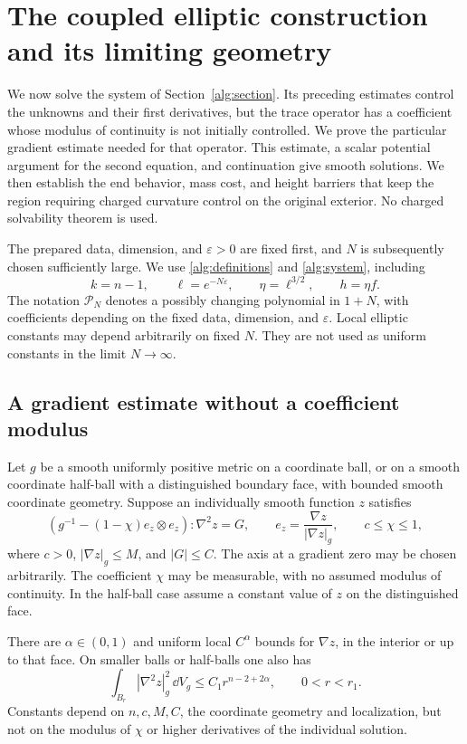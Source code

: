 \section{The coupled elliptic construction and its limiting geometry}
\label{pde:section}

We now solve the system of Section~\ref{alg:section}.  Its preceding
estimates control the unknowns and their first derivatives, but the trace
operator has a coefficient whose modulus of continuity is not initially
controlled.  We prove the particular gradient estimate needed for that
operator.  This estimate, a scalar potential argument for the second
equation, and continuation give smooth solutions.  We then establish the
end behavior, mass cost, and height barriers that keep the region requiring
charged curvature control on the original exterior.  No charged
solvability theorem is used.

The prepared data, dimension, and \(\varepsilon>0\) are fixed first, and
\(N\) is subsequently chosen sufficiently large.  We use
\eqref{alg:definitions} and \eqref{alg:system}, including
\[
 k=n-1,\qquad \ell=e^{-N\varepsilon},\qquad
 \eta=\ell^{3/2},\qquad h=\eta f.
\]
The notation \(\mathcal P_N\) denotes a possibly changing polynomial in
\(1+N\), with coefficients depending on the fixed data, dimension, and
\(\varepsilon\).  Local elliptic constants may depend arbitrarily on fixed
\(N\).  They are not used as uniform constants in the limit \(N\to\infty\).

\subsection{A gradient estimate without a coefficient modulus}

\begin{lemma}
\label{pde:special-gradient}
Let \(g\) be a smooth uniformly positive metric on a coordinate ball, or
on a smooth coordinate half-ball with a distinguished boundary face,
with bounded smooth coordinate geometry.  Suppose an individually smooth
function \(z\) satisfies
\begin{equation}
 \left(g^{-1}-(1-\chi)e_z\otimes e_z\right):\nabla^2 z=G,
 \qquad e_z=\frac{\nabla z}{|\nabla z|_g},
 \qquad c\le\chi\le1,
 \label{pde:special-equation}
\end{equation}
where \(c>0\), \(|\nabla z|_g\le M\), and \(|G|\le C\).
The axis at a gradient zero may be chosen arbitrarily.  The coefficient
\(\chi\) may be measurable, with no assumed modulus of continuity.
In the half-ball case assume a constant value of \(z\) on the
distinguished face.

There are \(\alpha\in(0,1)\) and uniform local \(C^\alpha\) bounds for
\(\nabla z\), in the interior or up to that face.  On smaller balls or
half-balls one also has
\begin{equation}
 \int_{B_r}|\nabla^2z|_g^2\,\dd V_g
 \le C_1r^{n-2+2\alpha},\qquad 0<r<r_1.
 \label{pde:hessian-morrey}
\end{equation}
Constants depend on \(n,c,M,C\), the coordinate geometry and localization,
but not on the modulus of \(\chi\) or higher derivatives of the individual
solution.
\end{lemma}

